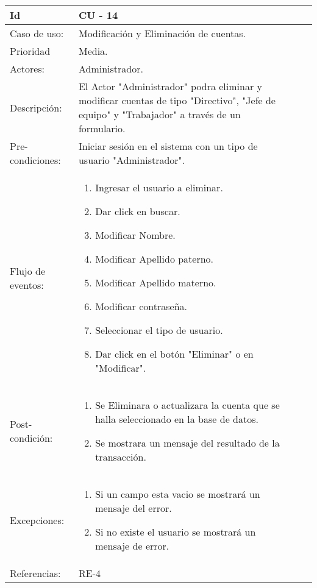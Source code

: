 \documentclass[11pt,a4paper]{article}
\begin{document}
\begin{tabular}[c]{|p{3cm}|p{13cm}|p{2.5cm}|p{3cm}|}
\hline 
\rule[-1ex]{0pt}{2.5ex} Id & CU - 14 \\ 
\hline 
\rule[-1ex]{0pt}{2.5ex} Caso de uso: & Modificación y Eliminación de cuentas. \\ 
\hline 
\rule[-1ex]{0pt}{2.5ex} Prioridad & Media. \\ 
\hline 
\rule[-1ex]{0pt}{2.5ex} Actores: & Administrador. \\ 
\hline 
\rule[-1ex]{0pt}{2.5ex} Descripción: & El Actor "Administrador" podra eliminar y modificar cuentas de tipo "Directivo", "Jefe de equipo" y "Trabajador" a través de un formulario. \\ 
\hline 
\rule[-1ex]{0pt}{2.5ex} Pre-condiciones: & Iniciar sesión en el sistema con un tipo de usuario "Administrador". \\ 
\hline 
\rule[-1ex]{0pt}{2.5ex} Flujo de eventos: & \begin{enumerate}
\item Ingresar el usuario a eliminar.
\item Dar click en buscar.
\item Modificar Nombre.
\item Modificar Apellido paterno.
\item Modificar Apellido materno.
\item Modificar contraseña.
\item Seleccionar el tipo de usuario.
\item Dar click en el botón "Eliminar" o en "Modificar".
\end{enumerate} \\ 
\hline 
\rule[-1ex]{0pt}{2.5ex} Post-condición: & \begin{enumerate}
\item Se Eliminara o actualizara la cuenta que se halla seleccionado en la base de datos.
\item Se mostrara un mensaje del resultado de la transacción.
\end{enumerate} \\ 
\hline 
\rule[-1ex]{0pt}{2.5ex} Excepciones: & \begin{enumerate}
\item Si un campo esta vacio se mostrará un mensaje del error.
\item Si no existe el usuario se mostrará un mensaje de error.
\end{enumerate} \\ 
\hline 
\rule[-1ex]{0pt}{2.5ex} Referencias: & RE-4\\ 
\hline 
\end{tabular} 
\\
\end{document}

